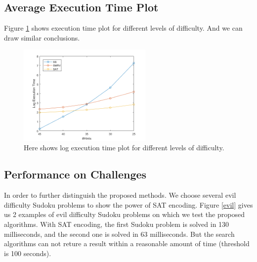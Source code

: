 \documentclass[11pt]{article}
\begin{document}
\subsection{Average Execution Time Plot}
Figure \ref{time} shows execution time plot for different levels of difficulty. And we can draw similar conclusions.

\begin{figure}
\begin{center}
\includegraphics[width=0.58\textwidth]{fig/Time.png}
\end{center}

\caption{Here shows log execution time plot for different levels of difficulty.}
\label{time}
\end{figure}

\subsection{Performance on Challenges}
In order to further distinguish the proposed methods. We choose several evil difficulty Sudoku problems to show the power of SAT encoding. Figure \ref{evil} gives us 2 examples of evil difficulty Sudoku problems on which we test the proposed algorithms. With SAT encoding, the first Sudoku problem is solved in 130 milliseconds, and the second one is solved in 63 milliseconds. But the search algorithms can not reture a result within a reasonable amount of time (threshold is 100 seconds).
\end{document}
